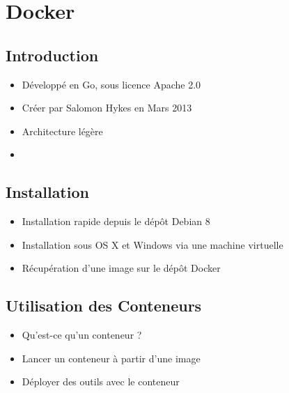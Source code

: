 \documentclass{beamer}
\begin{document}
    \section{Docker}
    \subsection{Introduction}
    \begin{frame}
       \begin{itemize}
          \item{Développé en Go, sous licence Apache 2.0}
          \item{Créer par Salomon Hykes en Mars 2013}
          \item{Architecture légère}
          \item{}
       \end{itemize}
    \end{frame}

    \subsection{Installation}
    \begin{frame}
       \begin{itemize}
          \item{Installation rapide depuis le dépôt Debian 8}
          \item{Installation sous OS X et Windows via une machine virtuelle}
          \item{Récupération d'une image sur le dépôt Docker}
       \end{itemize}
    \end{frame}

    \subsection{Utilisation des Conteneurs}
    \begin{frame}
       \begin{itemize}
          \item{Qu'est-ce qu'un conteneur ?}
          \item{Lancer un conteneur à partir d'une image}
          \item{Déployer des outils avec le conteneur}
       \end{itemize}
       \begin{exampleblock}{}
          \em{}
       \end{exampleblock}
    \end{frame}
\end{document}
